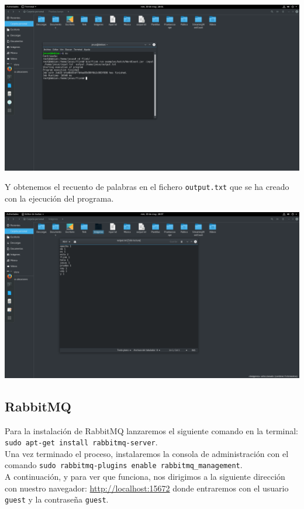 \documentclass[12pt,letterpaper]{article}
\begin{document}
\begin{center}
	\includegraphics[scale=0.24]{14.png}
\end{center}

Y obtenemos el recuento de palabras en el fichero \texttt{output.txt} que se ha creado con la ejecución del programa.
\begin{center}
	\includegraphics[scale=0.24]{15.png}
\end{center}


\subsection{RabbitMQ}
Para la instalación de RabbitMQ lanzaremos el siguiente comando en la terminal: \texttt{sudo apt-get install rabbitmq-server}.\\

Una vez terminado el proceso, instalaremos la consola de administración con el comando \texttt{sudo rabbitmq-plugins enable rabbitmq\_management}.\\

A continuación, y para ver que funciona, nos dirigimos a la siguiente dirección con nuestro navegador: \url{http://localhost:15672} donde entraremos con el usuario \texttt{guest} y la contraseña \texttt{guest}.
\end{document}

